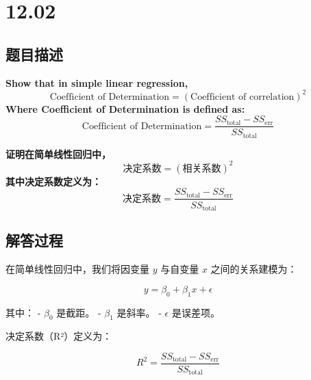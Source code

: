 \documentclass[UTF8]{article}
\theoremstyle{MyLineTheoremStyle} %
\theoremstyle{MyBlockTheoremStyle} %
\theoremstyle{MySubsubsectionStyle} %
\begin{document}

\newpage




\section{12.02}
\subsection*{题目描述}
\textbf{Show that in simple linear regression,}
\[
\text{Coefficient of Determination} = (\text{Coefficient of correlation})^2
\]
\textbf{Where Coefficient of Determination is defined as:}
\[
\text{Coefficient of Determination} = \frac{SS_{\text{total}} - SS_{\text{err}}}{SS_{\text{total}}}
\]

\textbf{证明在简单线性回归中，}
\[
\text{决定系数} = (\text{相关系数})^2
\]
\textbf{其中决定系数定义为：}
\[
\text{决定系数} = \frac{SS_{\text{total}} - SS_{\text{err}}}{SS_{\text{total}}}
\]

\subsection*{解答过程}

在简单线性回归中，我们将因变量 \( y \) 与自变量 \( x \) 之间的关系建模为：

\[
y = \beta_0 + \beta_1 x + \epsilon
\]

其中：
- \( \beta_0 \) 是截距。
- \( \beta_1 \) 是斜率。
- \( \epsilon \) 是误差项。

决定系数（R²）定义为：

\[
R^2 = \frac{SS_{\text{total}} - SS_{\text{err}}}{SS_{\text{total}}}
\]
\end{document}
